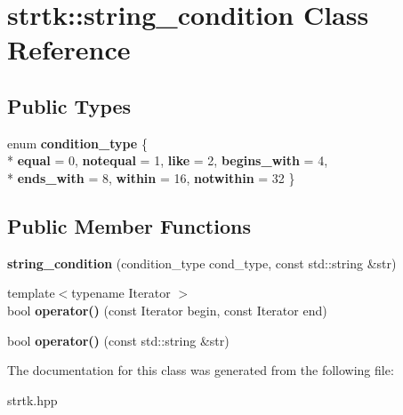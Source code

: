 \hypertarget{classstrtk_1_1string__condition}{\section{strtk\-:\-:string\-\_\-condition Class Reference}
\label{classstrtk_1_1string__condition}
}
\subsection*{Public Types}
\begin{DoxyCompactItemize}
\item 
enum {\bfseries condition\-\_\-type} \{ \\*
{\bfseries equal} = 0, 
{\bfseries notequal} = 1, 
{\bfseries like} = 2, 
{\bfseries begins\-\_\-with} = 4, 
\\*
{\bfseries ends\-\_\-with} = 8, 
{\bfseries within} = 16, 
{\bfseries notwithin} = 32
 \}
\end{DoxyCompactItemize}
\subsection*{Public Member Functions}
\begin{DoxyCompactItemize}
\item 
\hypertarget{classstrtk_1_1string__condition_a6f2e2e9bc63eb47fe293c7e04a5d2a53}{{\bfseries string\-\_\-condition} (condition\-\_\-type cond\-\_\-type, const std\-::string \&str)}\label{classstrtk_1_1string__condition_a6f2e2e9bc63eb47fe293c7e04a5d2a53}

\item 
\hypertarget{classstrtk_1_1string__condition_af6b832117d8db6a7ff1e3790b89d2fd7}{{\footnotesize template$<$typename Iterator $>$ }\\bool {\bfseries operator()} (const Iterator begin, const Iterator end)}\label{classstrtk_1_1string__condition_af6b832117d8db6a7ff1e3790b89d2fd7}

\item 
\hypertarget{classstrtk_1_1string__condition_a06280f6f95b3b1f584812993e276fee1}{bool {\bfseries operator()} (const std\-::string \&str)}\label{classstrtk_1_1string__condition_a06280f6f95b3b1f584812993e276fee1}

\end{DoxyCompactItemize}


The documentation for this class was generated from the following file\-:\begin{DoxyCompactItemize}
\item 
strtk.\-hpp\end{DoxyCompactItemize}
